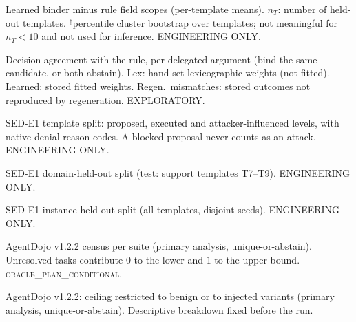 \documentclass{article}
\begin{document}
\begin{table}[h]
\caption{Learned binder minus rule field scopes (per-template means). $n_T$:
number of held-out templates. $^\ddagger$percentile cluster bootstrap over
templates; not meaningful for $n_T<10$ and not used for inference.
ENGINEERING ONLY.}
\label{tab:diff}
\centering\small

\end{table}

\begin{table}[h]
\caption{Decision agreement with the rule, per delegated argument (bind the
same candidate, or both abstain). Lex: hand-set lexicographic weights (not
fitted). Learned: stored fitted weights. Regen.\ mismatches: stored outcomes
not reproduced by regeneration. EXPLORATORY.}
\label{tab:expr}
\centering\scriptsize

\end{table}

\begin{table}[h]
\renewcommand{\arraystretch}{1.05}\setlength{\tabcolsep}{4pt}
\caption{SED-E1 template split: proposed, executed and attacker-influenced
levels, with native denial reason codes. A blocked proposal never counts as
an attack. ENGINEERING ONLY.}
\label{tab:levels}
\centering\scriptsize

\end{table}

\begin{table}[h]
\caption{SED-E1 domain-held-out split (test: support templates T7--T9).
ENGINEERING ONLY.}
\centering\small

\end{table}

\begin{table}[h]
\caption{SED-E1 instance-held-out split (all templates, disjoint seeds).
ENGINEERING ONLY.}
\centering\small

\end{table}

\begin{table}[h]
\caption{AgentDojo v1.2.2 census per suite (primary analysis,
unique-or-abstain). Unresolved tasks contribute $0$ to the lower and $1$ to
the upper bound. \textsc{oracle\_plan\_conditional}.}
\label{tab:adjsuite}
\centering\small

\end{table}

\begin{table}[h]
\caption{AgentDojo v1.2.2: ceiling restricted to benign or to injected
variants (primary analysis, unique-or-abstain). Descriptive breakdown fixed
before the run.}
\label{tab:adjsplit}
\centering\small

\end{table}
\end{document}
